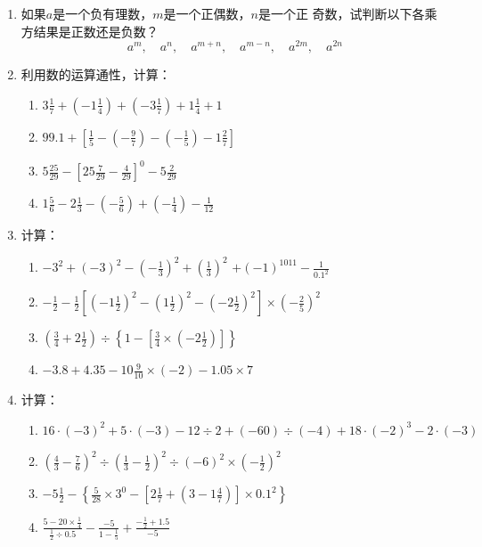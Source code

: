 \begin{enumerate}
	\item 如果$a$是一个负有理数，$m$是一个正偶数，$n$是一个正
	奇数，试判断以下各乘方结果是正数还是负数？
	\[a^m,\quad a^n,\quad a^{m+n},\quad a^{m-n},\quad a^{2m},\quad a^{2n} \]
	
	\item 利用数的运算通性，计算：
	\begin{enumerate}
		\item  $3 \frac{1}{7}+\left(-1 \frac{1}{4}\right)+\left(-3 \frac{1}{7}\right)+1 \frac{1}{4}+1$
		\item  $99.1+\left[\frac{1}{5}-\left(-\frac{9}{7}\right)-\left(-\frac{1}{5}\right)-1 \frac{2}{7}\right]$
		\item  $5 \frac{25}{29}-\left[25 \frac{7}{29}-\frac{4}{29}\right]^{0}-5 \frac{2}{29}$
		\item  $1 \frac{5}{6}-2 \frac{1}{3}-\left(-\frac{5}{6}\right)+\left(-\frac{1}{4}\right)-\frac{1}{12}$ 
	\end{enumerate}
	
	\item  计算：
	\begin{enumerate}
		\item $-3^{2}+(-3)^{2}-\left(-\frac{1}{3}\right)^{2}+\left(\frac{1}{3}\right)^{2}$
		$+(-1)^{1011}-\frac{1}{0.1^{2}}$
		\item $-\frac{1}{2}-\frac{1}{2}\left[\left(-1 \frac{1}{2}\right)^{2}-\left(1 \frac{1}{2}\right)^{2}-\left(-2 \frac{1}{2}\right)^{2}\right] \times\left(-\frac{2}{5}\right)^{2}$
		\item $\left(\frac{3}{4}+2 \frac{1}{2}\right) \div\left\{1-\left[\frac{3}{4} \times\left(-2 \frac{1}{2}\right)\right]\right\}$
		\item $-3.8+4.35-10 \frac{9}{10} \times(-2)-1.05 \times 7$
	\end{enumerate}
	
	
	\item 计算：
	\begin{enumerate}
		\item $16 \cdot(-3)^{2}+5 \cdot(-3)-12 \div 2+(-60) \div(-4)+18 \cdot(-2)^{3}-2 \cdot(-3)$
		\item $\left(\frac{4}{3}-\frac{7}{6}\right)^{2} \div\left(\frac{1}{3}-\frac{1}{2}\right)^{2} \div(-6)^{2} \times\left(-\frac{1}{2}\right)^{2}$
		\item $-5 \frac{1}{2}-\left\{\frac{5}{28} \times 3^{0}-\left[2 \frac{1}{7}+\left(3-1 \frac{4}{7}\right)\right] \times 0.1^{2}\right\}$
		\item $\frac{5-20 \times \frac{1}{4}}{\frac{1}{2}\div 0.5}-\frac{-5}{1-\frac{1}{5}}+\frac{-\frac{1}{2}+1.5}{-5}$
	\end{enumerate}
	

\end{enumerate}
